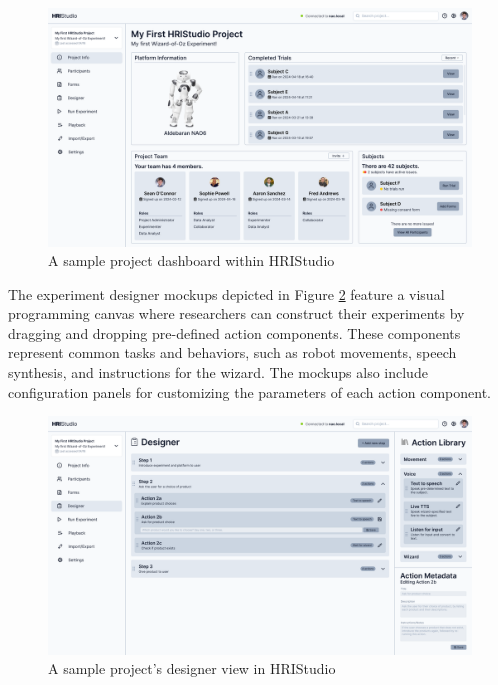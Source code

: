\documentclass[letterpaper, 10 pt, conference]{ieeeconf}
\begin{document}
\begin{figure}[h]
    \begin{center}
        \includegraphics[width=0.4\paperwidth]{assets/mockups/projectdashboard}
        \vskip -0.3cm
        \caption{A sample project dashboard within HRIStudio}
        \label{dashboard}
    \end{center}
    \vskip -0.4cm
\end{figure}

The experiment designer mockups depicted in Figure \ref{designer} feature a visual programming canvas where researchers can construct their experiments by dragging and dropping pre-defined action components. These components represent common tasks and behaviors, such as robot movements, speech synthesis, and instructions for the wizard. The mockups also include configuration panels for customizing the parameters of each action component.

\begin{figure}[h]
    \begin{center}
        \includegraphics[width=0.4\paperwidth]{assets/mockups/experimentdesigner}
         \vskip -0.3cm
        \caption{A sample project's designer view in HRIStudio}
        \label{designer}
    \end{center}
    \vskip -0.5cm
\end{figure}
\end{document}
